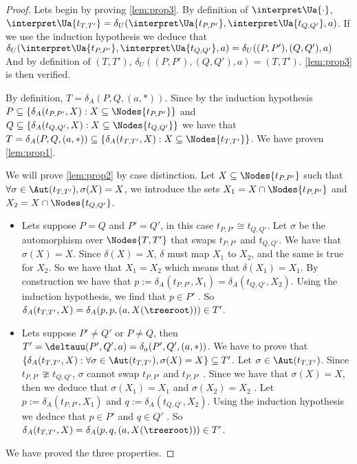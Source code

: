 \documentclass[a4paper,UKenglish,cleveref, autoref, thm-restate]{lipics-v2021}
\begin{document}
\begin{proof}
	Lets begin by proving \ref{lem:prop3}.
	By definition of $\interpret \Ua {\cdot}$,
	$\interpret \Ua {t_{T,T'}} = \delta_U (\interpret \Ua {t_{P,P'}}, \interpret \Ua {t_{Q,Q'}}, a)$.
	If we use the induction hypothesis we deduce that
	$\delta_U (\interpret \Ua {t_{P,P'}}, \interpret \Ua {t_{Q,Q'}}, a) = \delta_U ((P,P'), (Q,Q'), a)$
	And by definition of $(T,T')$, $\delta_U ((P,P'), (Q,Q'), a) = (T,T')$.
	\ref{lem:prop3} is then verified.

	By definition, $T = \delta_A(P,Q,(a,*))$. Since by the induction hypothesis $P \subseteq \{ \delta_A (t_{P,P'},X) : X \subseteq \Nodes {t_{P,P'}}\}$
	and $Q \subseteq \{ \delta_A (t_{Q,Q'},X) : X \subseteq \Nodes {t_{Q,Q'}}\}$  we have that
	$T = \delta_A(P,Q,(a,*)) \subseteq \{ \delta_A (t_{T,T'},X) : X \subseteq \Nodes {t_{T,T'}}\}$. We have proven \ref{lem:prop1}.

	We will prove \ref{lem:prop2} by case distinction.
	Let $X \subseteq \Nodes {t_{P,P'}}$ such that $\forall \sigma \in \Aut (t_{T,T'}), \sigma(X) = X$, we introduce the
	sets $X_1 = X \cap \Nodes {t_{P,P'}}$ and $X_2 = X \cap \Nodes {t_{Q,Q'}}$.
	\begin{itemize}
		\item Lets suppose $P = Q$ and $P' = Q'$, in this case $t_{P,P'} \cong t_{Q,Q'}$. 
		      Let $\sigma$ be the automorphism over $\Nodes{T,T'}$ that swaps  $t_{P,P'}$ and $t_{Q,Q'}$.
		      We have that $\sigma (X) = X$. Since $\delta(X) = X$, $\delta$ must map $X_1$ to $X_2$, and the same is true for
		      $X_2$. So we have that $X_1 = X_2$ which means that $\delta(X_1) = X_1$. By construction we have that $p := \delta_A(t_{P,P'}, X_1) =  \delta_A(t_{Q,Q'}, X_2)$.
		      Using the induction hypothesis, we find that $p \in P'$ . So
		      $\delta_A (t_{T,T'}, X) = \delta_A(p,p,(a, X(\treeroot))) \in T'$. 

		\item Lets suppose $P' \neq Q'$ or $P \neq Q$, then $T' = \deltauu (P',Q',a) = \delta_a(P',Q',(a,*))$. We have to prove that
		      $\{ \delta_A (t_{T,T'},X) : \forall \sigma \in \Aut(t_{T,T'}), \sigma(X) = X\} \subseteq T'$.
		      Let $\sigma \in \Aut(t_{T,T'})$. Since $t_{P,P'} \ncong t_{Q,Q'}$, $\sigma$ cannot swap $t_{P,P'}$ and
		      $t_{P,P'}$ . Since we have that $\sigma(X) = X$, then we deduce that $\sigma(X_1) = X_1$ and
		      $\sigma(X_2) = X_2$ . Let $p := \delta_A (t_{P,P'}, X_1)$ and $q := \delta_A (t_{Q,Q'}, X_2)$.
		      Using the induction hypothesis we deduce that $p \in P'$ and $q \in Q'$ .
		      So $\delta_A (t_{T,T'}, X) = \delta_A(p,q,(a, X(\treeroot))) \in T'$.
	\end{itemize}
	We have proved the three properties.


\end{proof}
\end{document}
